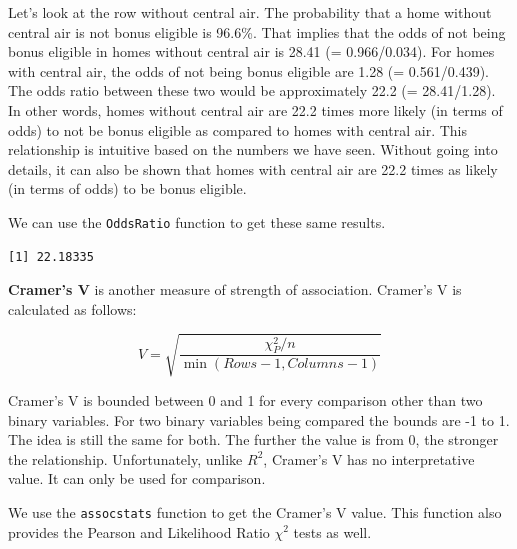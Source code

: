 \documentclass[
  letterpaper,
  DIV=11,
  numbers=noendperiod]{scrreprt}
\newenvironment{Shaded}{\begin{snugshade}}{\end{snugshade}}
\newcommand{\FunctionTok}[1]{\textcolor[rgb]{0.28,0.35,0.67}{#1}}
\newcommand{\NormalTok}[1]{\textcolor[rgb]{0.00,0.23,0.31}{#1}}
\newcommand{\SpecialCharTok}[1]{\textcolor[rgb]{0.37,0.37,0.37}{#1}}
\begin{document}
Let's look at the row without central air. The probability that a home
without central air is not bonus eligible is 96.6\%. That implies that
the odds of not being bonus eligible in homes without central air is
28.41 (= 0.966/0.034). For homes with central air, the odds of not being
bonus eligible are 1.28 (= 0.561/0.439). The odds ratio between these
two would be approximately 22.2 (= 28.41/1.28). In other words, homes
without central air are 22.2 times more likely (in terms of odds) to not
be bonus eligible as compared to homes with central air. This
relationship is intuitive based on the numbers we have seen. Without
going into details, it can also be shown that homes with central air are
22.2 times as likely (in terms of odds) to be bonus eligible.

We can use the \texttt{OddsRatio} function to get these same results.

\begin{Shaded}
\end{Shaded}

\begin{verbatim}
[1] 22.18335
\end{verbatim}

\textbf{Cramer's V} is another measure of strength of association.
Cramer's V is calculated as follows:

\[
V = \sqrt{\frac{\chi^2_P/n}{\min(Rows-1, Columns-1)}}
\]

Cramer's V is bounded between 0 and 1 for every comparison other than
two binary variables. For two binary variables being compared the bounds
are -1 to 1. The idea is still the same for both. The further the value
is from 0, the stronger the relationship. Unfortunately, unlike \(R^2\),
Cramer's V has no interpretative value. It can only be used for
comparison.

We use the \texttt{assocstats} function to get the Cramer's V value.
This function also provides the Pearson and Likelihood Ratio \(\chi^2\)
tests as well.

\begin{Shaded}
\end{Shaded}
\end{document}
